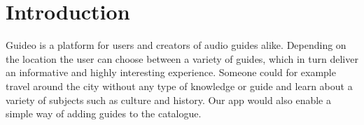 \documentclass[12pt]{article}
\theoremstyle{definition}
\newenvironment{text}{
}{}
\begin{document}
\tableofcontents
\pagebreak
 
\section{Introduction}
\begin{text}
Guideo is a platform for users and creators of audio guides alike. Depending on the location the user can choose between a variety of guides, which in turn deliver
an informative and highly interesting experience. Someone could for example travel around the city without any type of knowledge or guide and learn about a variety of subjects
such as culture and history. Our app would also enable a simple way of adding guides to the catalogue.   
 
\end{text}
\pagebreak
 
\end{document}
